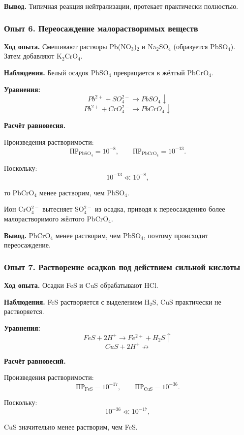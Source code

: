 \documentclass[a4paper,12pt]{article}
\begin{document}
	\textbf{Вывод.}  
	Типичная реакция нейтрализации, протекает практически полностью.
	
	
	\subsubsection*{Опыт 6. Переосаждение малорастворимых веществ}
	
	\quad\textbf{ Ход опыта.}  
	Смешивают растворы Pb(NO$_3$)$_2$ и Na$_2$SO$_4$ (образуется PbSO$_4$). Затем добавляют K$_2$CrO$_4$.
	
	\textbf{Наблюдения.}  
	Белый осадок PbSO$_4$ превращается в жёлтый PbCrO$_4$.
	
	\textbf{Уравнения:}
	\[
	Pb^{2+} + SO_4^{2-} \rightarrow PbSO_4\downarrow
	\]
	\[
	Pb^{2+} + CrO_4^{2-} \rightarrow PbCrO_4\downarrow
	\]
	
	\textbf{Расчёт равновесия.}
	
	Произведения растворимости:
	\[
	\text{ПР}_{\text{PbSO}_4} = 10^{-8}, \qquad 
	\text{ПР}_{\text{PbCrO}_4} = 10^{-13}.
	\]
	
	Поскольку:
	\[
	10^{-13} \ll 10^{-8},
	\]
	
	то PbCrO$_4$ менее растворим, чем PbSO$_4$.
	
	Ион CrO$_4^{2-}$ вытесняет SO$_4^{2-}$ из осадка, приводя к переосаждению более малорастворимого жёлтого PbCrO$_4$.
	
	\textbf{Вывод.}  
	PbCrO$_4$ менее растворим, чем PbSO$_4$, поэтому происходит переосаждение.
	
	
	\subsubsection*{Опыт 7. Растворение осадков под действием сильной кислоты}
	
	\quad\textbf{ Ход опыта.}  
	Осадки FeS и CuS обрабатывают HCl.
	
	\textbf{Наблюдения.}  
	FeS растворяется с выделением H$_2$S, CuS практически не растворяется.
	
	\textbf{Уравнения:}
	\[
	FeS + 2H^+ \rightarrow Fe^{2+} + H_2S\uparrow
	\]
	\[
	CuS + 2H^+ \not\rightarrow 
	\]
	
	\textbf{Расчёт равновесий.}
	
	Произведения растворимости:
	\[
	\text{ПР}_{\text{FeS}} = 10^{-17}, \qquad
	\text{ПР}_{\text{CuS}} = 10^{-36}.
	\]
	
	Поскольку:
	\[
	10^{-36} \ll 10^{-17},
	\]
	
	CuS значительно менее растворим, чем FeS.
	 
\end{document}
